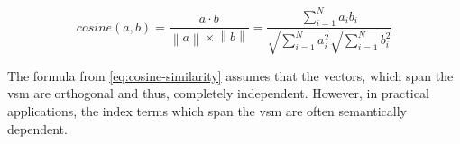 \begin{equation}
    cosine(a,b) = \frac{a \cdot b}{\left\| a \right\| \times \left\| b \right\|} = \frac{\sum_{i=1}^{N}a_{i}b_{i}}{\sqrt{\sum_{i=1}^{N}{a}^2_{i}}\sqrt{\sum_{i=1}^{N}{b}^2_{i}}}
    \label{eq:cosine-similarity}
\end{equation}

The formula from \autoref{eq:cosine-similarity} assumes that the vectors, which span the \ac{vsm} are orthogonal and thus, 
completely independent.
However, in practical applications, the index terms which span the \ac{vsm} are often semantically dependent.

%